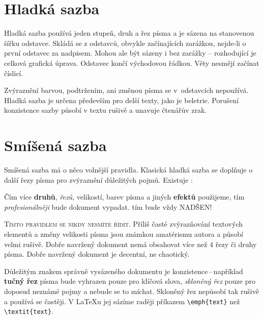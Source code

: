 \documentclass[a4paper, 10pt, twocolumn]{article}
\begin{document}

\section{Hladká sazba}
  Hladká sazba používá jeden stupeň, druh a řez písma a je sázena na stanovenou šířku odstavce. Skládá se z odstavců, obvykle začínajících zarážkou, nejde-li o první odstavec za nadpisem. Mohou ale být sázeny i bez zarážky -- rozhodující je celková grafická úprava. Odstavec končí východovou řádkou. Věty nesmějí začínat číslicí.

  Zvýraznění barvou, podtržením, ani změnou písma se v~odstavcích nepoužívá. Hladká sazba je určena především pro delší texty, jako je beletrie. Porušení konzistence sazby působí v textu rušivě a unavuje čtenářův zrak.
\section{Smíšená sazba}
  Smíšená sazba má o něco volnější pravidla. Klasická hladká sazba se doplňuje o další řezy písma pro zvýraznění důležitých pojmů. Existuje :

  \begin{adjustwidth}{0.77cm}{0.8cm}
    \medskip
      Čím více \textbf{druhů}, \emph{řezů}, {\scriptsize velikostí}, barev písma a jiných {\tiny \textbf{efektů}} použijeme, tím \emph{profesionálněji} bude dokument vypadat. { tím} {\large bude} {\Large vždy} {\huge NADŠEN!}
    \medskip
  \end{adjustwidth}

  \textsc{Tímto pravidlem se nikdy nesmíte řídit.} Příliš časté zvýrazňování textových elementů a změny velikosti písma jsou známkou amatérismu autora a působí velmi rušivě. Dobře navržený dokument nemá obsahovat více než
  4 řezy či druhy písma. Dobře navržený dokument je decentní, ne chaotický.

  Důležitým znakem správně vysázeného dokumentu je konzistence\,--\,například \textbf{tučný řez} písma bude vyhrazen pouze pro klíčová slova, \textsl{skloněný řez} pouze pro doposud neznámé pojmy a nebude se to míchat. Skloněný řez nepůsobí tak rušivě a používá se častěji. V \LaTeX u jej sázíme raději příkazem \verb|\emph{text}| než \verb|\textit{text}|.
\end{document}
